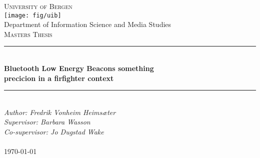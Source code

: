 \documentclass[thesis.tex]{subfiles}
\begin{document}

\newcommand{\HRule}{\rule{\linewidth}{0.5mm}}

\begin{titlepage}
\begin{center}
\textsc{\Huge University of Bergen}\\[0.4cm]
\texttt{[image: fig/uib]} \\[0.5cm]

\large Department of Information Science and Media Studies\\[0.7cm]
\textsc{\huge Masters Thesis}\\[0.4cm]
\HRule \\[0.4cm]
{ \huge \bfseries Bluetooth Low Energy Beacons something \\precicion in a firfighter context}\\[0.5cm]
\HRule \\[1.0cm]

\emph{Author: Fredrik Vonheim Heimsæter}\\
\emph{Supervisor: Barbara Wasson}\\
\emph{Co-supervisor: Jo Dugstad Wake}\\

\paragraph*{}
\end{center}
\vfill
\begin{center}
{\large \today}
\end{center}
\end{titlepage}
\end{document}
